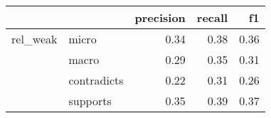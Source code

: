 \begin{tabular}{llrrr}
\toprule
         &          &  precision &  recall &   f1 \\
\midrule
rel\_weak & micro &       0.34 &    0.38 & 0.36 \\
         & macro &       0.29 &    0.35 & 0.31 \\
         & contradicts &       0.22 &    0.31 & 0.26 \\
         & supports &       0.35 &    0.39 & 0.37 \\
\bottomrule
\end{tabular}
